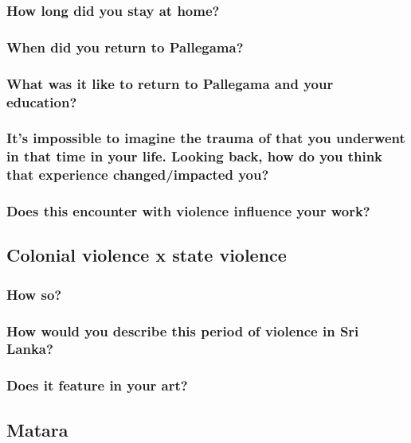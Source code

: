 \documentclass[11pt]{article}
\begin{document}
\subsubsection{How long did you stay at home?}
\label{sec:org4d21d39}
\subsubsection{When did you return to Pallegama?}
\label{sec:orgad4e93e}
\subsubsection{What was it like to return to Pallegama and your education?}
\label{sec:orgcf27bbc}
\subsubsection{It's impossible to imagine the trauma of that you underwent in that time in your life. Looking back, how do you think that experience changed/impacted you?}
\label{sec:org35154e4}
\subsubsection{Does this encounter with violence influence your work?}
\label{sec:org97fd26b}


\subsection{Colonial violence x state violence}
\label{sec:org1d5b08e}

\subsubsection{How so?}
\label{sec:org3730d18}
\subsubsection{How would you describe this period of violence in Sri Lanka?}
\label{sec:org7d25d66}
\subsubsection{Does it feature in your art?}
\label{sec:org519aec9}

\subsection{Matara}
\label{sec:org6163489}
\end{document}
